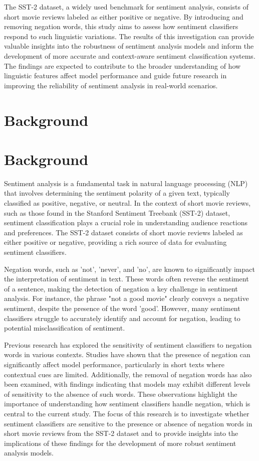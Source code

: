 \documentclass{article}
\begin{document}
The SST-2 dataset, a widely used benchmark for sentiment analysis, consists of short movie reviews labeled as either positive or negative. By introducing and removing negation words, this study aims to assess how sentiment classifiers respond to such linguistic variations. The results of this investigation can provide valuable insights into the robustness of sentiment analysis models and inform the development of more accurate and context-aware sentiment classification systems. The findings are expected to contribute to the broader understanding of how linguistic features affect model performance and guide future research in improving the reliability of sentiment analysis in real-world scenarios.
\section{Background}
\section*{Background}

Sentiment analysis is a fundamental task in natural language processing (NLP) that involves determining the sentiment polarity of a given text, typically classified as positive, negative, or neutral. In the context of short movie reviews, such as those found in the Stanford Sentiment Treebank (SST-2) dataset, sentiment classification plays a crucial role in understanding audience reactions and preferences. The SST-2 dataset consists of short movie reviews labeled as either positive or negative, providing a rich source of data for evaluating sentiment classifiers.

Negation words, such as 'not', 'never', and 'no', are known to significantly impact the interpretation of sentiment in text. These words often reverse the sentiment of a sentence, making the detection of negation a key challenge in sentiment analysis. For instance, the phrase "not a good movie" clearly conveys a negative sentiment, despite the presence of the word 'good'. However, many sentiment classifiers struggle to accurately identify and account for negation, leading to potential misclassification of sentiment.

Previous research has explored the sensitivity of sentiment classifiers to negation words in various contexts. Studies have shown that the presence of negation can significantly affect model performance, particularly in short texts where contextual cues are limited. Additionally, the removal of negation words has also been examined, with findings indicating that models may exhibit different levels of sensitivity to the absence of such words. These observations highlight the importance of understanding how sentiment classifiers handle negation, which is central to the current study. The focus of this research is to investigate whether sentiment classifiers are sensitive to the presence or absence of negation words in short movie reviews from the SST-2 dataset and to provide insights into the implications of these findings for the development of more robust sentiment analysis models.
\end{document}
